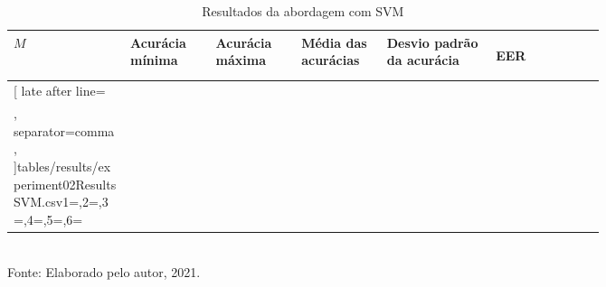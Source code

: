 \begin{table}[H]
	\newcommand{\mc}[3]{\multicolumn{#1}{#2}{#3}}
	\begin{center}
		\caption{Resultados da abordagem com SVM}
		\begin{tabular}{|p{0.15\linewidth}|p{0.11\linewidth}|p{0.11\linewidth}|p{0.11\linewidth}|p{0.14\linewidth}|p{0.14\linewidth}|}\hline
			\rowcolor{tcA}
			\centering\textbf{$M$} & \centering\textbf{Acurácia mínima} & \centering\textbf{Acurácia máxima} & \centering\textbf{Média das acurácias} & \centering\textbf{Desvio padrão da acurácia} & \begin{center}\textbf{EER}\end{center}\\\hline
			
			\rowcolor{tcB}
			\csvreader[
			late after line=\\\hline\rowcolor{tcB},%
			separator=comma,
			]{tables/results/experiment02ResultsSVM.csv}{1=\eme,2=\minAccu,3=\maxAccu,4=\meanAccu,5=\stdDev,6=\eer}{\centering\eme\% & \centering\StrSubstitute[0]{\minAccu}{.}{,} & \centering\StrSubstitute[0]{\maxAccu}{.}{,} & \centering\StrSubstitute[0]{\meanAccu}{.}{,} & \centering\StrSubstitute[0]{\stdDev}{.}{,} & \StrSubstitute[0]{\eer}{.}{,}}
			
		\end{tabular}
		\label{tab:experiment03Results}
		\\Fonte: Elaborado pelo autor, 2021.
	\end{center}
\end{table}